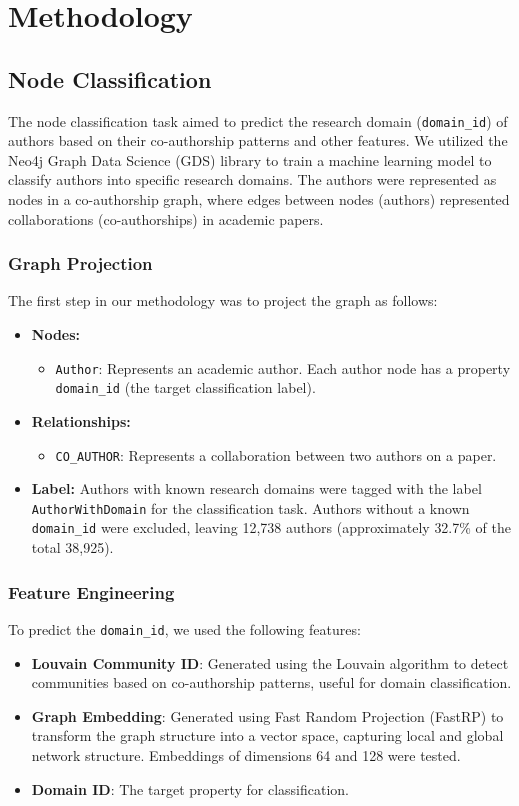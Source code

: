 \documentclass[conference, 12pt]{IEEEtran}
\begin{document}
\section{Methodology}

\subsection{Node Classification}
The node classification task aimed to predict the research domain (\texttt{domain\_id}) of authors based on their co-authorship patterns and other features. We utilized the Neo4j Graph Data Science (GDS) library to train a machine learning model to classify authors into specific research domains. The authors were represented as nodes in a co-authorship graph, where edges between nodes (authors) represented collaborations (co-authorships) in academic papers.

\subsubsection{Graph Projection}
The first step in our methodology was to project the graph as follows:
\begin{itemize}
  \item \textbf{Nodes:} 
    \begin{itemize}
      \item \texttt{Author}: Represents an academic author. Each author node has a property \texttt{domain\_id} (the target classification label).
    \end{itemize}
  \item \textbf{Relationships:} 
    \begin{itemize}
      \item \texttt{CO\_AUTHOR}: Represents a collaboration between two authors on a paper.
    \end{itemize}
  \item \textbf{Label:} Authors with known research domains were tagged with the label \texttt{AuthorWithDomain} for the classification task. Authors without a known \texttt{domain\_id} were excluded, leaving 12,738 authors (approximately 32.7\% of the total 38,925).
\end{itemize}

\subsubsection{Feature Engineering}
To predict the \texttt{domain\_id}, we used the following features:
\begin{itemize}
  \item \textbf{Louvain Community ID}: Generated using the Louvain algorithm to detect communities based on co-authorship patterns, useful for domain classification.
  \item \textbf{Graph Embedding}: Generated using Fast Random Projection (FastRP) to transform the graph structure into a vector space, capturing local and global network structure. Embeddings of dimensions 64 and 128 were tested.
  \item \textbf{Domain ID}: The target property for classification.
\end{itemize}
\end{document}
